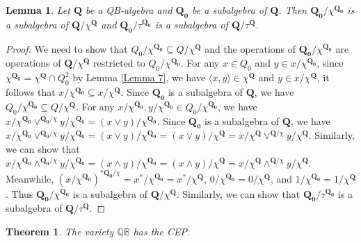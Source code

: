 \documentclass[12pt]{amsart}
\newtheorem{theorem}{Theorem}[section]
\newtheorem{lemma}{Lemma}[section]
\theoremstyle{definition}
\theoremstyle{remark}
\numberwithin{equation}{section}
\begin{document}
\begin{lemma}\label{Lem subalgebra}
Let $\mathbf{Q}$ be a QB-algebra and $\mathbf{Q_0}$ be a subalgebra of $\mathbf{Q}$. Then $\mathbf{Q_0}/\chi^{\mathbf{Q_0}}$ is a subalgebra of $\mathbf{Q}/\chi^{\mathbf{Q}}$ and $\mathbf{Q_0}/\tau^{\mathbf{Q_0}}$ is a subalgebra of $\mathbf{Q}/\tau^{\mathbf{Q}}$.
\end{lemma}

\begin{proof}
We need to show that $Q_0/\chi^{\mathbf{Q_0}} \subseteq Q/\chi^{\mathbf{Q}}$ and the operations of $\mathbf{Q_0}/\chi^{\mathbf{Q_0}}$ are operations of $\mathbf{Q}/\chi^{\mathbf{Q}}$ restricted to $Q_0/\chi^{\mathbf{Q_0}}$. For any $x \in Q_0$ and $y \in x/\chi^{\mathbf{Q_0}}$, since $\chi^{\mathbf{Q_0}} = \chi^{\mathbf{Q}} \cap Q_0^{2}$ by Lemma \ref{Lemma 7}, we have $\langle x, y \rangle \in \chi^{\mathbf{Q}}$ and $y \in x/\chi^{\mathbf{Q}}$, it follows that $x/\chi^{\mathbf{Q_0}} \subseteq x/\chi^{\mathbf{Q}}$. Since $\mathbf{Q_0}$ is a subalgebra of $\mathbf{Q}$, we have $Q_0/\chi^{\mathbf{Q_0}} \subseteq Q/\chi^{\mathbf{Q}}$. For any $x/\chi^{\mathbf{Q_0}}, y/\chi^{\mathbf{Q_0}} \in Q_0/\chi^{\mathbf{Q_0}}$, we have $x/\chi^{\mathbf{Q_0}} \vee^{\mathbf{Q_0}/\chi} y/\chi^{\mathbf{Q_0}} = (x \vee y)/\chi^{\mathbf{Q_0}}$. Since $\mathbf{Q_0}$ is a subalgebra of $\mathbf{Q}$, we have $x/\chi^{\mathbf{Q_0}} \vee^{\mathbf{Q_0}/\chi} y/\chi^{\mathbf{Q_0}} = (x \vee y)/\chi^{\mathbf{Q_0}} = (x \vee y)/\chi^{\mathbf{Q}} = x/\chi^{\mathbf{Q}} \vee^{\mathbf{Q}/\chi} y/\chi^{\mathbf{Q}}$. Similarly, we can show that $x/\chi^{\mathbf{Q_0}} \wedge^{\mathbf{Q_0}/\chi} y/\chi^{\mathbf{Q_0}} = (x \wedge y)/\chi^{\mathbf{Q_0}} = (x \wedge y)/\chi^{\mathbf{Q}} = x/\chi^{\mathbf{Q}} \wedge^{\mathbf{Q}/\chi} y/\chi^{\mathbf{Q}}$. Meanwhile, $(x/\chi^{\mathbf{Q_0}})^{*{\mathbf{Q_0}/\chi}} = x^{*}/\chi^{\mathbf{Q_0}} = x^{*}/\chi^{\mathbf{Q}}$, $0/\chi^{\mathbf{Q_0}} = 0/\chi^{\mathbf{Q}}$, and $1/\chi^{\mathbf{Q_0}} = 1/\chi^{\mathbf{Q}}$. Thus $\mathbf{Q_0}/\chi^{\mathbf{Q_0}}$ is a subalgebra of $\mathbf{Q}/\chi^{\mathbf{Q}}$. Similarly, we can show that $\mathbf{Q_0}/\tau^{\mathbf{Q_0}}$ is a subalgebra of $\mathbf{Q}/\tau^{\mathbf{Q}}$.
\end{proof}

\begin{theorem}\label{QB CEP}
The variety $\mathbb{QB}$ has the CEP.
\end{theorem}
\end{document}
